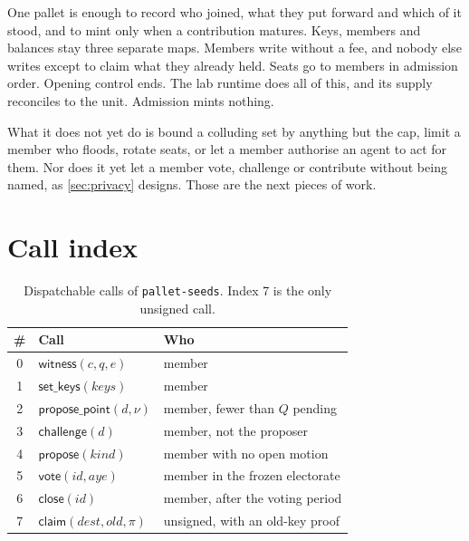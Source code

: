 \documentclass[11pt,a4paper]{article}
\theoremstyle{definition}
\theoremstyle{plain}
\theoremstyle{remark}
\begin{document}
One pallet is enough to record who joined, what they put forward and which of it stood, and to mint only when a contribution matures. Keys, members and balances stay three separate maps. Members write without a fee, and nobody else writes except to claim what they already held. Seats go to members in admission order. Opening control ends. The lab runtime does all of this, and its supply reconciles to the unit. Admission mints nothing.

What it does not yet do is bound a colluding set by anything but the cap, limit a member who floods, rotate seats, or let a member authorise an agent to act for them. Nor does it yet let a member vote, challenge or contribute without being named, as \cref{sec:privacy} designs. Those are the next pieces of work.

\appendix
\section{Call index}
\label{app:calls}

\begin{table}[h]
\centering
\caption{Dispatchable calls of \texttt{pallet-seeds}. Index 7 is the only unsigned call.}
\label{tab:calls}
\begin{tabular}{@{}cll@{}}
\toprule
\# & Call & Who \\
\midrule
0 & $\mathsf{witness}(c, q, e)$ & member \\
1 & $\mathsf{set\_keys}(\mathit{keys})$ & member \\
2 & $\mathsf{propose\_point}(d, \nu)$ & member, fewer than $Q$ pending \\
3 & $\mathsf{challenge}(d)$ & member, not the proposer \\
4 & $\mathsf{propose}(\mathit{kind})$ & member with no open motion \\
5 & $\mathsf{vote}(\mathit{id}, \mathit{aye})$ & member in the frozen electorate \\
6 & $\mathsf{close}(\mathit{id})$ & member, after the voting period \\
7 & $\mathsf{claim}(\mathit{dest}, \mathit{old}, \pi)$ & unsigned, with an old-key proof \\
\bottomrule
\end{tabular}
\end{table}



\end{document}
